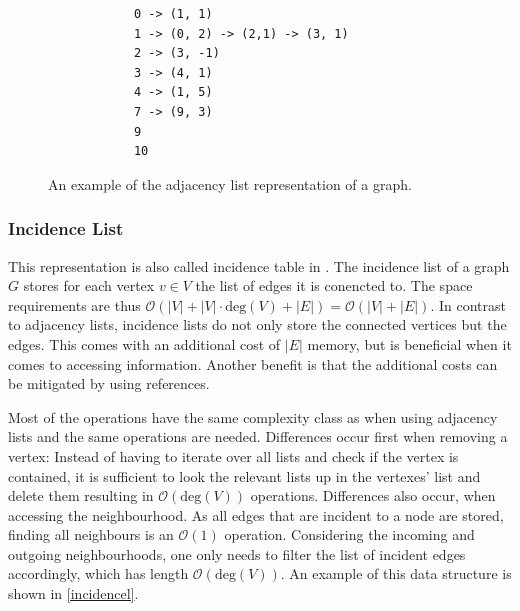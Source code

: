         \begin{figure}[htp]
         \begin{center}
          \begin{verbatim}
            0 -> (1, 1)
            1 -> (0, 2) -> (2,1) -> (3, 1)
            2 -> (3, -1)
            3 -> (4, 1)
            4 -> (1, 5)
            7 -> (9, 3)
            9
            10
          \end{verbatim}
         \end{center}
         \caption{An example of the adjacency list representation of a graph.}
         \label{adjl}
        \end{figure}
        
        \subsubsection*{Incidence List}\label{inci}
        This representation is also called incidence table in \autocite{Gross1998GraphTA}.
        The incidence list of a graph $G$ stores for each vertex $v \in V$ the list of edges it is conencted to. 
        The space requirements are thus $\mathcal{O}(|V| + |V| \cdot \text{deg}(V) + |E|) = \mathcal{O}(|V| + |E|)$. 
        In contrast to adjacency lists, incidence lists do not only store the connected vertices but the edges. 
        This comes with an additional cost of $|E|$ memory, but is beneficial when it comes to accessing information. 
        Another benefit is that the additional costs can be mitigated by using references.
        
        Most of the operations have the same complexity class as when using adjacency lists and the same operations are needed. 
        Differences occur first when removing a vertex:
        Instead of having to iterate over all lists and check if the vertex is contained, it is sufficient to look the relevant lists up in the vertexes' list and delete them resulting in $\mathcal{O}(\text{deg}(V))$ operations.        
        Differences also occur, when accessing the neighbourhood. 
        As all edges that are incident to a node are stored, finding all neighbours is an $\mathcal{O}(1)$ operation. 
        Considering the incoming and outgoing neighbourhoods, one only needs to filter the list of incident edges accordingly, which has length $\mathcal{O}(\text{deg}(V))$.
        An example of this data structure is shown in \ref{incidencel}.
        
